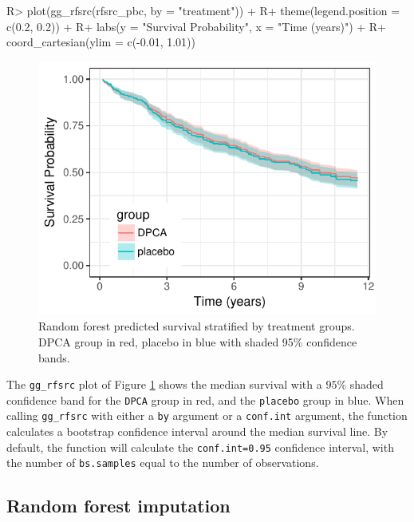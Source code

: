 \documentclass[article, nojss]{jss}
\begin{document}
\begin{Schunk}
\begin{Sinput}
R> plot(gg_rfsrc(rfsrc_pbc, by = "treatment")) +
R+   theme(legend.position = c(0.2, 0.2)) +
R+   labs(y = "Survival Probability", x = "Time (years)") +
R+   coord_cartesian(ylim = c(-0.01, 1.01))
\end{Sinput}
\begin{figure}[!htb]

{\centering \includegraphics{rfs-rfsrc-mean2-1}

}

\caption[Random forest predicted survival stratified by treatment groups]{Random forest predicted survival stratified by treatment groups. DPCA group in red, placebo in blue with shaded 95\% confidence bands.}\label{fig:rfsrc-mean2}
\end{figure}
\end{Schunk}

The \texttt{gg\_rfsrc} plot of Figure \ref{fig:rfsrc-mean2} shows the
median survival with a \(95\%\) shaded confidence band for the
\texttt{DPCA} group in red, and the \texttt{placebo} group in blue. When
calling \texttt{gg\_rfsrc} with either a \texttt{by} argument or a
\texttt{conf.int} argument, the function calculates a bootstrap
confidence interval around the median survival line. By default, the
function will calculate the \texttt{conf.int=0.95} confidence interval,
with the number of \texttt{bs.samples} equal to the number of
observations.

\subsection{Random forest imputation}\label{random-forest-imputation}
\end{document}
